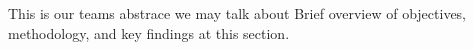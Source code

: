 This is our teams abstrace we may talk about Brief overview of objectives, methodology, and key findings at this section.